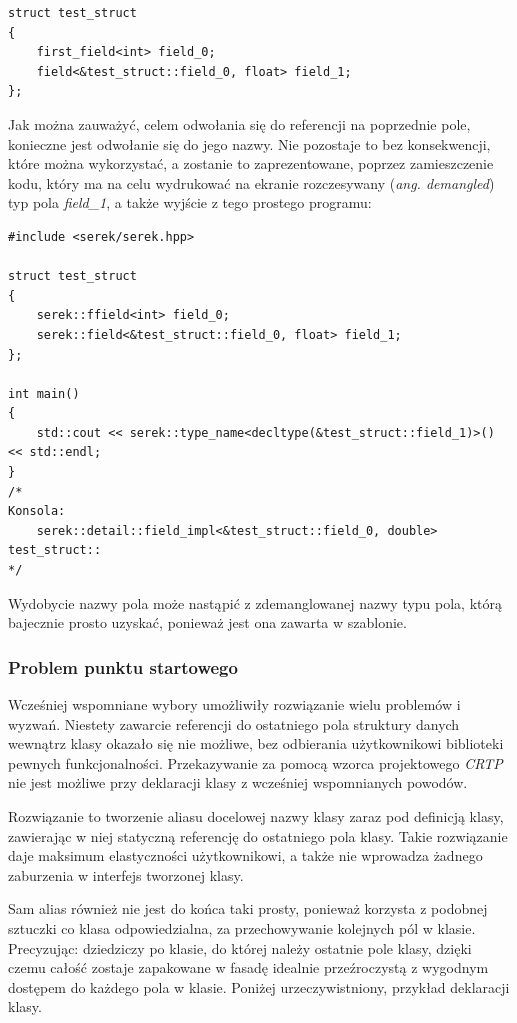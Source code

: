 \documentclass[12pt]{article}
\newcommand{\n}{\newline}
\newcommand{\nonpl}[1]{{\it #1}}
\newcommand{\code}[1]{{\it #1}}
\newcommand{\ang}[1]{\nonpl{ang. #1}}
\newcommand{\CRTP}{\nonpl{CRTP} }
\begin{document}
{{{				\begin{lstlisting}[frame=single]
struct test_struct
{
	first_field<int> field_0;
	field<&test_struct::field_0, float> field_1;
};
				\end{lstlisting}

				Jak można zauważyć, celem odwołania się do referencji na poprzednie pole, konieczne jest odwołanie się do jego nazwy. Nie pozostaje to bez
				konsekwencji, które można wykorzystać, a zostanie to zaprezentowane, poprzez zamieszczenie kodu, który ma na celu wydrukować na ekranie
				rozczesywany (\ang{demangled}) typ pola \code{field\_1}, a także wyjście z tego prostego programu:\n

				\begin{lstlisting}[frame=single]
#include <serek/serek.hpp>

struct test_struct
{
	serek::ffield<int> field_0;
	serek::field<&test_struct::field_0, float> field_1;
};

int main()
{
	std::cout << serek::type_name<decltype(&test_struct::field_1)>() << std::endl;
}
/*
Konsola:
	serek::detail::field_impl<&test_struct::field_0, double> test_struct::
*/
				\end{lstlisting}

				Wydobycie nazwy pola może nastąpić z zdemanglowanej nazwy typu pola, którą bajecznie prosto uzyskać, ponieważ jest ona zawarta
				w szablonie.
			}

			{
				\subsubsection{Problem punktu startowego}

				Wcześniej wspomniane wybory umożliwiły rozwiązanie wielu problemów i wyzwań. Niestety zawarcie referencji do ostatniego pola
				struktury danych wewnątrz klasy okazało się nie możliwe, bez odbierania użytkownikowi biblioteki pewnych funkcjonalności.
				Przekazywanie za pomocą wzorca projektowego \CRTP nie jest możliwe przy deklaracji klasy z wcześniej wspomnianych powodów.\n

				Rozwiązanie to tworzenie aliasu docelowej nazwy klasy zaraz pod definicją klasy, zawierając w niej statyczną referencję do ostatniego pola klasy.
				Takie rozwiązanie daje maksimum elastyczności użytkownikowi, a także nie wprowadza żadnego zaburzenia w interfejs tworzonej klasy.\n

				Sam alias również nie jest do końca taki prosty, ponieważ korzysta z podobnej sztuczki co klasa odpowiedzialna, za przechowywanie
				kolejnych pól w klasie. Precyzując: dziedziczy po klasie, do której należy ostatnie pole klasy, dzięki czemu całość zostaje
				zapakowane w fasadę idealnie przeźroczystą z wygodnym dostępem do każdego pola w klasie. Poniżej urzeczywistniony, przykład deklaracji klasy.\n

}}}
\end{document}
